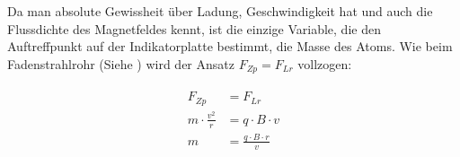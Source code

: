 Da man absolute Gewissheit über Ladung, Geschwindigkeit hat und auch die Flussdichte des Magnetfeldes kennt, ist die einzige Variable, die den Auftreffpunkt auf der Indikatorplatte bestimmt, die Masse des Atoms. Wie beim Fadenstrahlrohr (Siehe ) wird der Ansatz $F_{Zp} = F_{Lr}$ vollzogen:

\begin{align}
\begin{split}
	F_{Zp} 				  &= F_{Lr} \\
	m \cdot \frac{v^2}{r} &= q \cdot B \cdot v \\
	m 					  &= \frac{q \cdot B \cdot r}{v}
\end{split}
\end{align}










